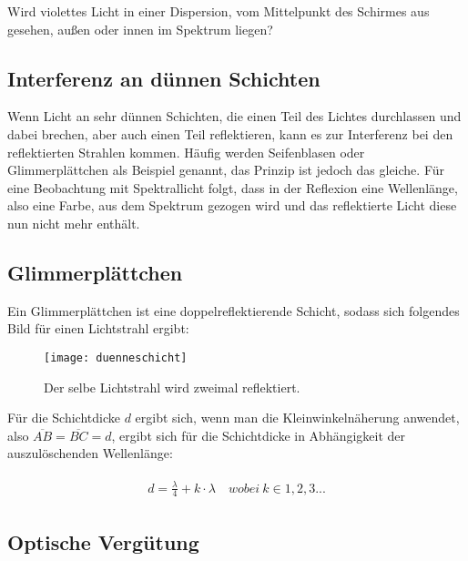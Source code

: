 \begin{Aufgabe}
Wird violettes Licht in einer Dispersion, vom Mittelpunkt des Schirmes aus gesehen, außen oder innen im Spektrum liegen?
\end{Aufgabe}


\subsection{Interferenz an dünnen Schichten}	\label{subsec:duenneschicht}

Wenn Licht an sehr dünnen Schichten, die einen Teil des Lichtes durchlassen und dabei brechen, aber auch einen Teil reflektieren, kann es zur Interferenz bei den reflektierten Strahlen kommen. Häufig werden Seifenblasen oder Glimmerplättchen als Beispiel genannt, das Prinzip ist jedoch das gleiche. Für eine Beobachtung mit Spektrallicht folgt, dass in der Reflexion eine Wellenlänge, also eine Farbe, \glqq aus dem Spektrum gezogen wird\grqq{} und das reflektierte Licht diese nun nicht mehr enthält.


\subsection{Glimmerplättchen}

Ein Glimmerplättchen ist eine doppelreflektierende Schicht, sodass sich folgendes Bild für einen Lichtstrahl ergibt:

\begin{figure}[h!]
	\centering
	\texttt{[image: duenneschicht]}
	\caption{Der selbe Lichtstrahl wird zweimal reflektiert.}
\end{figure}

\begin{comment}
Bei beiden Reflexionen ereignet sich ein Phasensprung von $\pi$ (Siehe: \referenz{subsec:Reflexion}), sodass sich für die Schichtdicke, in Abhängigkeit der auszulöschenden Wellenlänge, folgendes ergibt:
\end{comment}

Für die Schichtdicke $d$ ergibt sich, wenn man die Kleinwinkelnäherung anwendet, also $\overline{AB} =  \overline{BC} = d$, ergibt sich für die Schichtdicke in Abhängigkeit der auszulöschenden Wellenlänge:

\begin{align}
\begin{split}
	d = \frac{\lambda}{4} + k \cdot \lambda \quad wobei \ k \in 1,2,3 ...
\end{split}
\end{align}


\subsection{Optische Vergütung}











